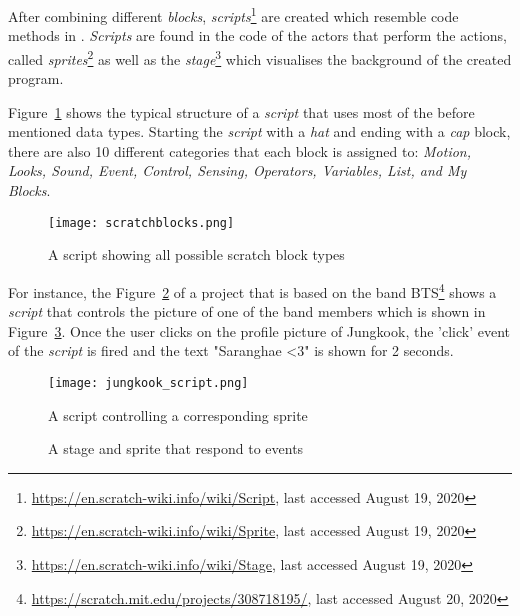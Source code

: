 After combining different \textit{blocks}, \textit{scripts}\footnote{\url{https://en.scratch-wiki.info/wiki/Script}, last accessed August 19, 2020} are created which resemble code methods in \java{}. \textit{Scripts} are found in the code of the actors that perform the actions, called \textit{sprites}\footnote{\url{https://en.scratch-wiki.info/wiki/Sprite}, last accessed August 19, 2020} as well as the \textit{stage}\footnote{\url{https://en.scratch-wiki.info/wiki/Stage}, last accessed August 19, 2020} which visualises the background of the created program. 

Figure~\ref{fig:scratchblocks} shows the typical structure of a \scratch{} \textit{script} that uses most of the before mentioned data types. Starting the \textit{script} with a \textit{hat} and ending with a \textit{cap} block, there are also 10 different categories that each block is assigned to: \textit{Motion, Looks, Sound, Event, Control, Sensing, Operators, Variables, List, and My Blocks}. 

\begin{figure}[t]
    \centering
    \texttt{[image: scratchblocks.png]}
    \caption[All types of scratch blocks]{\label{fig:scratchblocks} A script showing all possible scratch block types}
\end{figure}

For instance, the Figure~\ref{fig:script} of a \scratch{} project that is based on the band BTS\footnote{\url{https://scratch.mit.edu/projects/308718195/}, last accessed August 20, 2020} shows a \textit{script} that controls the picture of one of the band members which is shown in Figure~\ref{fig:sprite}. Once the user clicks on the profile picture of Jungkook, the 'click' event of the \textit{script} is fired and the text "Saranghae <3" is shown for 2 seconds.

\begin{figure}[t]
    \centering
    \texttt{[image: jungkook\_script.png]}
    \caption[Program that controls a sprite]{\label{fig:script} A \scratch{} script controlling a corresponding sprite}
\end{figure}

\begin{figure}%
    \centering
    \qquad
    \caption[A sprite's reaction after an executed event]{\label{fig:sprite}A \scratch{} stage and sprite that respond to events}%
\end{figure}


